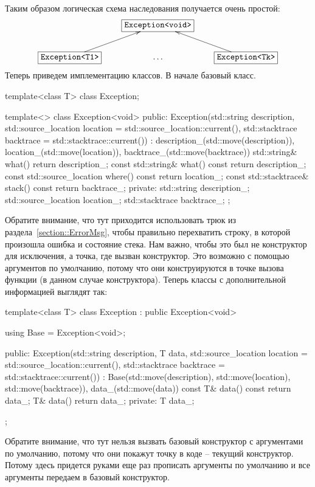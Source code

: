 Таким образом логическая схема наследования получается очень простой:
\[
\xymatrix{
  {}&{\texttt{Exception<void>}}
  	{
	\save
   [].[]*[F-]\frm{}
   \restore
	}
  &{}\\
  {\texttt{Exception<T1>}}\ar[ur]
    	{
	\save
   [].[]*[F-]\frm{}
   \restore
	}
  &{\ldots}&{\texttt{Exception<Tk>}}\ar[ul]
    	{
	\save
   [].[]*[F-]\frm{}
   \restore
	}
\\
}
\]
Теперь приведем имплементацию классов.
В начале базовый класс.
\begin{cppcode}
template<class T>
class Exception;

template<>
class Exception<void> {
public:
  Exception(std::string description,
            std::source_location location = std::source_location::current(),
            std::stacktrace backtrace = std::stacktrace::current())
      : description_(std::move(description)), location_(std::move(location)),
        backtrace_(std::move(backtrace)) {
  }
  std::string& what() {
    return description_;
  }
  const std::string& what() const {
    return description_;
  }
  const std::source_location where() const {
    return location_;
  }
  const std::stacktrace& stack() const {
    return backtrace_;
  }
private:
  std::string description_;
  std::source_location location_;
  std::stacktrace backtrace_;
};
\end{cppcode}
Обратите внимание, что тут приходится использовать трюк из раздела~\ref{section::ErrorMsg}, чтобы правильно перехватить строку, в которой произошла ошибка и состояние стека.
Нам важно, чтобы это был не конструктор для исключения, а точка, где вызван конструктор.
Это возможно с помощью аргументов по умолчанию, потому что они конструируются в точке вызова функции (в данном случае конструктора).
Теперь классы с дополнительной информацией выглядят так:
\begin{cppcode}
template<class T>
class Exception : public Exception<void> {
  using Base = Exception<void>;

public:
  Exception(std::string description, T data,
            std::source_location location = std::source_location::current(),
            std::stacktrace backtrace = std::stacktrace::current())
      : Base(std::move(description), std::move(location), std::move(backtrace)),
        data_(std::move(data)) {
  }
  const T& data() const {
    return data_;
  }
  T& data() {
    return data_;
  }
private:
  T data_;
};
\end{cppcode}
Обратите внимание, что тут нельзя вызвать базовый конструктор с аргументами по умолчанию, потому что они покажут точку в коде -- текущий конструктор.
Потому здесь придется руками еще раз прописать аргументы по умолчанию и все аргументы передаем в базовый конструктор.

